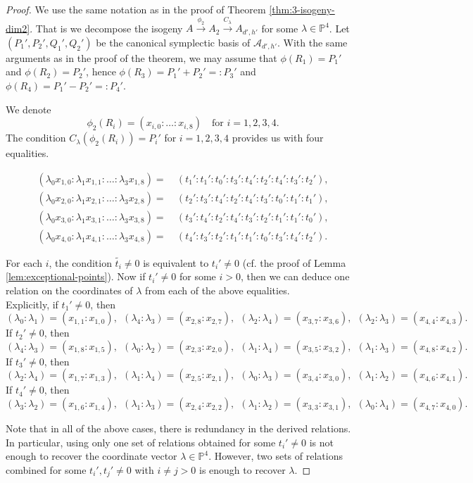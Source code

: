 \documentclass[11pt]{amsart}
\theoremstyle{definition}
\newcommand{\A}{\mathcal{A}}
\newcommand{\PP}{\mathbb{P}}
\begin{document}
\begin{proof}
	We use the same notation as in the proof of Theorem \ref{thm:3-isogeny-dim2}. That is we decompose the isogeny $A \xrightarrow{\phi_2} A_2 \xrightarrow{C_\lambda} A_{d',h'}$ for some $\lambda \in \PP^4$. Let $(P_1',P_2',Q_1',Q_2')$ be the canonical symplectic basis of $\A_{d',h'}$. With the same arguments as in the proof of the theorem, we may assume that $\phi(R_1) = P_1'$ and $\phi(R_2)=P_2'$, hence $\phi(R_3) = P_1'+P_2' =: P_3'$ and $\phi(R_4) = P_1'-P_2' =:P_4'$.
	
	
	We denote
	\[
	\phi_2(R_i) = (x_{i,0}:\dots: x_{i,8}) \quad \text{for } i =1,2,3,4.
	\]
	The condition $C_\lambda(\phi_2(R_i)) = P_i'$ for $i = 1,2,3,4$ provides us with four equalities. 
	
	\begin{align*}
		\left(\lambda_0 x_{1,0}: \lambda_1 x_{1,1} : \dots: \lambda_3 x_{1,8}\right) = &~
		(t_1' : t_1' : t_0':  t_3': t_4' : t_2' :  t_4' : t_3' : t_2'),\\
		\left(\lambda_0 x_{2,0}: \lambda_1 x_{2,1} : \dots: \lambda_3 x_{2,8}\right)  = &~
		(t_2': t_3' : t_4' : t_2' : t_4' : t_3 ': t_0' : t_1' : t_1' ),\\
		\left(\lambda_0 x_{3,0}: \lambda_1 x_{3,1} : \dots: \lambda_3 x_{3,8}\right)  = &~
		(t_3': t_4' : t_2' : t_4' : t_3' : t_2 ': t_1' : t_1' : t_0' ),\\
		\left(\lambda_0 x_{4,0}: \lambda_1 x_{4,1} : \dots: \lambda_3 x_{4,8}\right)  = &~
		(t_4': t_3' : t_2' : t_1' : t_1' : t_0 ': t_3' : t_4' : t_2' ).
	\end{align*}
	
	For each $i$, the condition $\tilde{t_i} \neq0$ is equivalent to $t_i' \neq 0$ (cf. the proof of Lemma \ref{lem:exceptional-points}). Now if $t_i'\neq 0$ for some $i>0$, then we can deduce one relation on the coordinates of $\lambda$ from each of the above equalities.\\
	Explicitly, if $t_1' \neq 0$, then
	\[
	(\lambda_0:\lambda_1) = (x_{1,1}:x_{1,0}), ~~
	(\lambda_4:\lambda_3) = (x_{2,8}:x_{2,7}), ~~
	(\lambda_2:\lambda_4) = (x_{3,7}:x_{3,6}), ~~
	(\lambda_2:\lambda_3) = (x_{4,4} : x_{4,3}).
	\]
	If $t_2' \neq 0$, then
	\[
	(\lambda_4:\lambda_3) = (x_{1,8}:x_{1,5}), ~~
	(\lambda_0:\lambda_2) = (x_{2,3}:x_{2,0}), ~~
	(\lambda_1:\lambda_4) = (x_{3,5}:x_{3,2}), ~~
	(\lambda_1:\lambda_3) = (x_{4,8} : x_{4,2}).
	\]
	If $t_3' \neq 0$, then
	\[
	(\lambda_2:\lambda_4) = (x_{1,7}:x_{1,3}), ~~
	(\lambda_1:\lambda_4) = (x_{2,5}:x_{2,1}), ~~
	(\lambda_0:\lambda_3) = (x_{3,4}:x_{3,0}), ~~
	(\lambda_1:\lambda_2) = (x_{4,6} : x_{4,1}).
	\]
	If $t_4' \neq 0$, then
	\[
	(\lambda_3:\lambda_2) = (x_{1,6}:x_{1,4}), ~~
	(\lambda_1:\lambda_3) = (x_{2,4}:x_{2,2}), ~~
	(\lambda_1:\lambda_2) = (x_{3,3}:x_{3,1}), ~~
	(\lambda_0:\lambda_4) = (x_{4,7} : x_{4,0}).
	\]
	
	Note that in all of the above cases, there is redundancy in the derived relations. In particular, using only one set of relations obtained for some $t_i' \neq 0$ is not enough to recover the coordinate vector $\lambda \in \PP^4$. However, two sets of relations combined for some $t_i',t_j' \neq 0$ with $i\neq j > 0$ is enough to recover $\lambda$. 
\end{proof}
\end{document}
